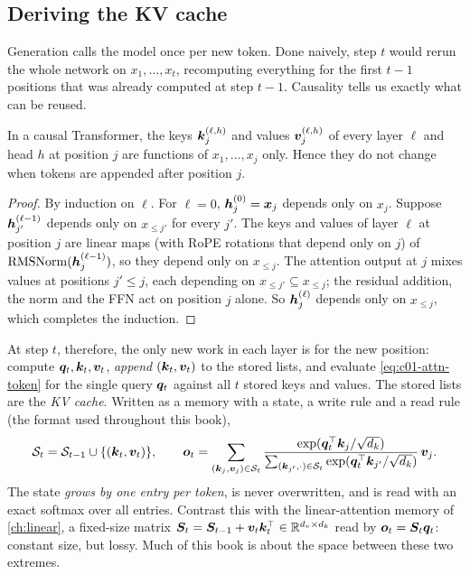 \subsection{Deriving the KV cache}\label{sec:c01-kv-cache}

Generation calls the model once per new token. Done naively, step $t$ would rerun the whole
network on $x_1, \dots, x_t$, recomputing everything for the first $t-1$ positions that was
already computed at step $t-1$. Causality tells us exactly what can be reused.

\begin{proposition}\label{prop:c01-kv-cache}
In a causal Transformer, the keys $\bm{k}_j^{(\ell, h)}$ and values $\bm{v}_j^{(\ell, h)}$ of every
layer $\ell$ and head $h$ at position $j$ are functions of $x_1, \dots, x_j$ only. Hence they
do not change when tokens are appended after position $j$.
\end{proposition}

\begin{proof}
By induction on $\ell$. For $\ell = 0$, $\bm{h}_j^{(0)} = \bm{x}_j$ depends only on $x_j$. Suppose
$\bm{h}_{j'}^{(\ell-1)}$ depends only on $x_{\le j'}$ for every $j'$. The keys and values of layer
$\ell$ at position $j$ are linear maps (with RoPE rotations that depend only on $j$) of
$\operatorname{RMSNorm}(\bm{h}_j^{(\ell-1)})$, so they depend only on $x_{\le j}$. The attention output at $j$
mixes values at positions $j' \le j$, each depending on $x_{\le j'} \subseteq x_{\le j}$; the
residual addition, the norm and the FFN act on position $j$ alone. So $\bm{h}_j^{(\ell)}$
depends only on $x_{\le j}$, which completes the induction.
\end{proof}

At step $t$, therefore, the only new work in each layer is for the new position: compute
$\bm{q}_t, \bm{k}_t, \bm{v}_t$, \emph{append} $(\bm{k}_t, \bm{v}_t)$ to the stored lists, and evaluate
\eqref{eq:c01-attn-token} for the single query $\bm{q}_t$ against all $t$ stored keys and
values. The stored lists are the \emph{KV cache}. Written as a memory with a state, a write
rule and a read rule (the format used throughout this book),
\begin{equation}\label{eq:c01-kv-memory}
  \mathcal{S}_t = \mathcal{S}_{t-1} \cup \{(\bm{k}_t, \bm{v}_t)\},\qquad
  \bm{o}_t = \sum_{(\bm{k}_j, \bm{v}_j)\in\mathcal{S}_t}
     \frac{\exp(\bm{q}_t^{\top}\bm{k}_j/\sqrt{d_k})}{\sum_{(\bm{k}_{j'},\cdot)\in\mathcal{S}_t}\exp(\bm{q}_t^{\top}\bm{k}_{j'}/\sqrt{d_k})}\,\bm{v}_j .
\end{equation}
The state \emph{grows by one entry per token}, is never overwritten, and is read with an
exact softmax over all entries. Contrast this with the linear-attention memory of
\cref{ch:linear}, a fixed-size matrix $\bm{S}_t = \bm{S}_{t-1} + \bm{v}_t\bm{k}_t^{\top} \in \mathbb{R}^{d_v\times
d_k}$ read by $\bm{o}_t = \bm{S}_t\bm{q}_t$: constant size, but lossy. Much of this book is about the
space between these two extremes.

